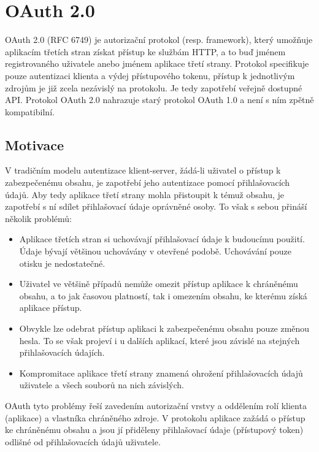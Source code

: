 \documentclass[]{fithesis3}
\begin{document}
\chapter{OAuth 2.0}

OAuth 2.0 (RFC 6749) je autorizační protokol (resp. framework), který umožňuje aplikacím třetích stran získat přístup ke službám HTTP, a to buď jménem registrovaného uživatele anebo jménem aplikace třetí strany. Protokol specifikuje pouze autentizaci klienta a výdej přístupového tokenu, přístup k jednotlivým zdrojům je již zcela nezávislý na protokolu. Je tedy zapotřebí veřejně dostupné API. Protokol OAuth 2.0 nahrazuje starý protokol OAuth 1.0 a není s ním zpětně kompatibilní.

	\section{Motivace}

	V tradičním modelu autentizace klient-server, žádá-li uživatel o přístup k zabezpečenému 			obsahu, je zapotřebí jeho autentizace pomocí přihlašovacích údajů. Aby tedy aplikace třetí 			strany mohla přistoupit k témuž obsahu, je zapotřebí s ní sdílet přihlašovací údaje oprávněné 		osoby. To však s sebou přináší několik problémů:

		\begin{itemize}
  		\item 
		Aplikace třetích stran si uchovávají přihlašovací údaje k budoucímu použití. Údaje bývají 			většinou uchovávány v otevřené podobě. Uchovávání pouze otisku je nedostatečné.

 		 \item 
		Uživatel ve většině případů nemůže omezit přístup aplikace k chráněnému obsahu, a to 			jak časovou platností, tak i omezením obsahu, ke kterému získá aplikace přístup.

 		 \item 
		Obvykle lze odebrat přístup aplikaci k zabezpečenému obsahu pouze 							změnou hesla. To se však projeví i u dalších aplikací, které jsou závislé na stejných 				přihlašovacích údajích.

  		\item 
		Kompromitace aplikace třetí strany znamená ohrožení přihlašovacích údajů 						uživatele a všech souborů na nich závislých.
		\end{itemize}

	OAuth tyto problémy řeší zavedením autorizační vrstvy a oddělením rolí klienta 					(aplikace) a vlastníka chráněného zdroje. V protokolu aplikace zažádá o přístup ke 				chráněnému obsahu  a jsou jí přiděleny přihlašovací údaje (přístupový token) odlišné od 			přihlašovacích údajů uživatele. 
\end{document}
